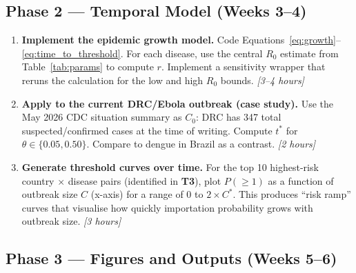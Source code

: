 \documentclass[12pt]{article}
\begin{document}
\subsection{Phase 2 --- Temporal Model (Weeks 3--4)}

\begin{enumerate}[label=\textbf{T\arabic*.}, resume]

  \item \textbf{Implement the epidemic growth model.}
    Code Equations~\ref{eq:growth}--\ref{eq:time_to_threshold}.
    For each disease, use the central $R_0$ estimate from
    Table~\ref{tab:params} to compute $r$. Implement a sensitivity
    wrapper that reruns the calculation for the low and high $R_0$
    bounds.
    \textit{[3--4 hours]}

  \item \textbf{Apply to the current DRC/Ebola outbreak (case study).}
    Use the May 2026 CDC situation summary as $C_0$:
    DRC has 347 total suspected/confirmed cases at the time of
    writing. Compute $t^*$ for $\theta \in \{0.05, 0.50\}$.
    Compare to dengue in Brazil as a contrast.
    \textit{[2 hours]}

  \item \textbf{Generate threshold curves over time.}
    For the top 10 highest-risk country $\times$ disease pairs
    (identified in \textbf{T3}), plot $P(\geq 1)$ as a function of
    outbreak size $C$ (x-axis) for a range of 0 to $2 \times C^*$.
    This produces ``risk ramp'' curves that visualise how quickly
    importation probability grows with outbreak size.
    \textit{[3 hours]}

\end{enumerate}

\subsection{Phase 3 --- Figures and Outputs (Weeks 5--6)}
\end{document}
